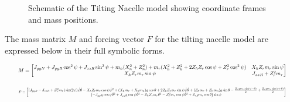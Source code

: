 \documentclass[onecolumn,draftcls]{IEEEtran}
\begin{document}
\begin{figure}[htbp]
    \caption{Schematic of the Tilting Nacelle model showing coordinate frames and mass positions.}
    \label{fig:tilting_nacelle_tower_top}
\end{figure}

The mass matrix $M$ and forcing vector $F$ for the tilting nacelle model are expressed below in their full symbolic forms.

\begin{equation}
    \label{eq:tilting_mass_matrix_full}
    \resizebox{0.95\textwidth}{!}{%
        $M = \begin{bmatrix}
                J_{yyN} + J_{yyR} \cos^{2}\psi + J_{zzR} \sin^{2}\psi + m_{n}(X_{n}^{2} + Z_{n}^{2}) + m_{r}(X_{h}^{2} + Z_{h}^{2} + 2 Z_{h} Z_{r} \cos\psi + Z_{r}^{2} \cos^{2}\psi) & X_{h} Z_{r} m_{r} \sin\psi \\
                X_{h} Z_{r} m_{r} \sin\psi                                                                                                                                            & J_{xxR} + Z_{r}^{2} m_{r}
            \end{bmatrix}$%
    }
\end{equation}

\begin{equation}
    \label{eq:tilting_forcing_terms_full}
    \resizebox{0.95\textwidth}{!}{%
        $F = \begin{bmatrix}
                (J_{yyR} - J_{zzR} + Z_{r}^{2} m_{r}) \sin(2\psi) \dot{\psi} \dot{\theta} - X_{h} Z_{r} m_{r} \cos\psi \dot{\psi}^{2} + (X_{h} m_{r} + X_{n} m_{n}) g \cos\theta + 2 Z_{h} Z_{r} m_{r} \sin\psi \dot{\psi} \dot{\theta} + (Z_{h} m_{r} + Z_{n} m_{n}) g \sin\theta - \frac{Z_{r} g m_{r} \sin(\psi - \theta)}{2} + \frac{Z_{r} g m_{r} \sin(\psi + \theta)}{2} \\
                \left(- J_{yyR} \cos\psi \dot{\theta}^{2} + J_{zzR} \cos\psi \dot{\theta}^{2} - Z_{h} Z_{r} m_{r} \dot{\theta}^{2} - Z_{r}^{2} m_{r} \cos\psi \dot{\theta}^{2} + Z_{r} g m_{r} \cos\theta \right) \sin\psi
            \end{bmatrix}$%
    }
\end{equation}
\end{document}
